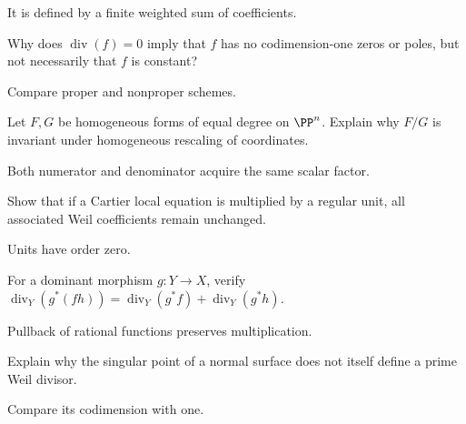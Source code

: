 \ifdefined\IncludeExerciseHints
\begin{hint}
It is defined by a finite weighted sum of coefficients.
\end{hint}
\fi
\begin{exercise}\label{exr:vi39-20}
Why does \(\operatorname{div}(f)=0\) imply that \(f\) has no codimension-one zeros or poles, but not necessarily that \(f\) is constant?
\end{exercise}
\ifdefined\IncludeExerciseHints
\begin{hint}
Compare proper and nonproper schemes.
\end{hint}
\fi
\begin{exercise}\label{exr:vi39-21}
Let \(F,G\) be homogeneous forms of equal degree on \(\PP^n\).  Explain why \(F/G\) is invariant under homogeneous rescaling of coordinates.
\end{exercise}
\ifdefined\IncludeExerciseHints
\begin{hint}
Both numerator and denominator acquire the same scalar factor.
\end{hint}
\fi
\begin{exercise}\label{exr:vi39-22}
Show that if a Cartier local equation is multiplied by a regular unit, all associated Weil coefficients remain unchanged.
\end{exercise}
\ifdefined\IncludeExerciseHints
\begin{hint}
Units have order zero.
\end{hint}
\fi
\begin{exercise}\label{exr:vi39-23}
For a dominant morphism \(g:Y\to X\), verify \(\operatorname{div}_Y(g^*(fh))=\operatorname{div}_Y(g^*f)+\operatorname{div}_Y(g^*h)\).
\end{exercise}
\ifdefined\IncludeExerciseHints
\begin{hint}
Pullback of rational functions preserves multiplication.
\end{hint}
\fi
\begin{exercise}\label{exr:vi39-24}
Explain why the singular point of a normal surface does not itself define a prime Weil divisor.
\end{exercise}
\ifdefined\IncludeExerciseHints
\begin{hint}
Compare its codimension with one.
\end{hint}
\fi
\ifdefined\IncludeExerciseSolutions
